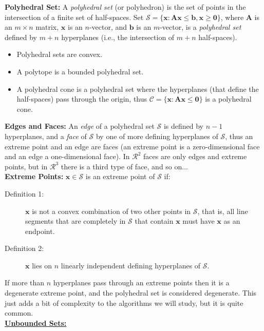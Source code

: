 {\bf Polyhedral Set:} A {\it polyhedral set} (or polyhedron) is the set of points in the intersection of a finite set of half-spaces. Set $\mathcal{S} = \{\mathbf{x}: \mathbf{A} \mathbf{x} \le \mathbf{b}, \mathbf{x} \ge \mathbf{0}\}$, where $\mathbf{A}$ is an $m \times n$ matrix, $\mathbf{x}$ is an $n$-vector, and $\mathbf{b}$ is an $m$-vector, is a {\it polyhedral set} defined by $m + n$ hyperplanes (i.e., the intersection of $m + n$ half-spaces).
\begin{itemize}
\item Polyhedral sets are convex. 
\item A polytope is a bounded polyhedral set.
\item A polyhedral cone is a polyhedral set where the hyperplanes (that define the half-spaces) pass through the origin, thus $\mathcal{C} = \{\mathbf{x}: \mathbf{A} \mathbf{x} \le \mathbf{0}\}$ is a polyhedral cone.
\end{itemize}

{\bf Edges and Faces:} An {\it edge} of a polyhedral set $\mathcal{S}$ is defined by $n-1$ hyperplanes, and a {\it face} of $\mathcal{S}$ by one of more defining hyperplanes of $\mathcal{S}$, thus an extreme point and an edge are faces (an extreme point is a zero-dimensional face and an edge a one-dimensional face).  In $\mathcal{R}^2$ faces are only edges and extreme points, but in $\mathcal{R}^3$ there is a third type of face, and so on... \\

{\bf Extreme Points:} $\mathbf{x} \in \mathcal{S}$ is an extreme point of $\mathcal{S}$ if:
\begin{description}
\item[Definition 1:] $\mathbf{x}$ is not a convex combination of two other points in $\mathcal{S}$, that is, all line segments that are completely in $\mathcal{S}$ that contain $\mathbf{x}$ must have $\mathbf{x}$ as an endpoint.
\item[Definition 2:] $\mathbf{x}$ lies on $n$ linearly independent defining hyperplanes of $\mathcal{S}$.
\end{description}


If more than $n$ hyperplanes pass through an extreme points then it is a degenerate extreme point, and the polyhedral set is considered degenerate. This just adds a bit of complexity to the algorithms we will study, but it is quite common. \\
  

\underline {\bf Unbounded Sets:} \\ 

